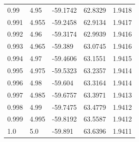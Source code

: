 \begin{tabular}{lllll}
0.99 & 4.95 & -59.1742 & 62.8329 & 1.9418 \\
0.991 & 4.955 & -59.2458 & 62.9134 & 1.9417 \\
0.992 & 4.96 & -59.3174 & 62.9939 & 1.9416 \\
0.993 & 4.965 & -59.389 & 63.0745 & 1.9416 \\
0.994 & 4.97 & -59.4606 & 63.1551 & 1.9415 \\
0.995 & 4.975 & -59.5323 & 63.2357 & 1.9414 \\
0.996 & 4.98 & -59.604 & 63.3164 & 1.9414 \\
0.997 & 4.985 & -59.6757 & 63.3971 & 1.9413 \\
0.998 & 4.99 & -59.7475 & 63.4779 & 1.9412 \\
0.999 & 4.995 & -59.8192 & 63.5587 & 1.9412 \\
1.0 & 5.0 & -59.891 & 63.6396 & 1.9411 \\
\bottomrule
\end{tabular}
